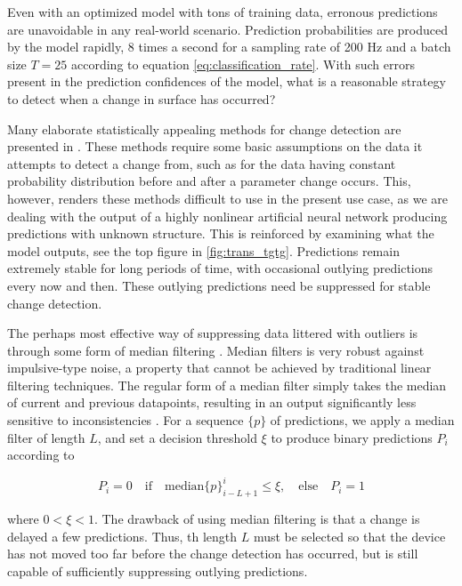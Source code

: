 Even with an optimized model with tons of training data, erronous predictions are unavoidable in any real-world scenario. Prediction probabilities are produced by the model rapidly, 8 times a second for a sampling rate of 200 Hz and a batch size $T=25$ according to equation \ref{eq:classification_rate}. With such errors present in the prediction confidences of the model, what is a reasonable strategy to detect when a change in surface has occurred?  

Many elaborate statistically appealing methods for change detection are presented in \citep{basseville_nikiforov_1993}. These methods require some basic assumptions on the data it attempts to detect a change from, such as for the data having constant probability distribution before and after a parameter change occurs. This, however, renders these methods difficult to use in the present use case, as we are dealing with the output of a highly nonlinear artificial neural network producing predictions with unknown structure. This is reinforced by examining what the model outputs, see the top figure in \ref{fig:trans_tgtg}. Predictions remain extremely stable for long periods of time, with occasional outlying predictions every now and then. These outlying predictions need be suppressed for stable change detection.

The perhaps most effective way of suppressing data littered with outliers is through some form of median filtering \citep{yin_yang_gabbouj_neuvo_1996}. Median filters is very robust against impulsive-type noise, a property that cannot be achieved by traditional linear filtering techniques. The regular form of a median filter simply takes the median of current and previous datapoints, resulting in an output significantly less sensitive to inconsistencies \citep{pearson_2002}. For a sequence $\{p\}$ of predictions, we apply a median filter of length $L$, and set a decision threshold $\xi$ to produce binary predictions $P_i$ according to
\citep{yin_yang_gabbouj_neuvo_1996}

\begin{equation}
	P_i=0 \quad\text{if}\quad\text{median}\{p\}_{i-L+1}^i\leq\xi, 
	\quad \text{else} \quad P_i = 1
\end{equation}

where $0<\xi<1$. The drawback of using median filtering is that a change is delayed a few predictions. Thus, th length $L$ must be selected so that the device has not moved too far before the change detection has occurred, but is still capable of sufficiently  suppressing outlying predictions. 


